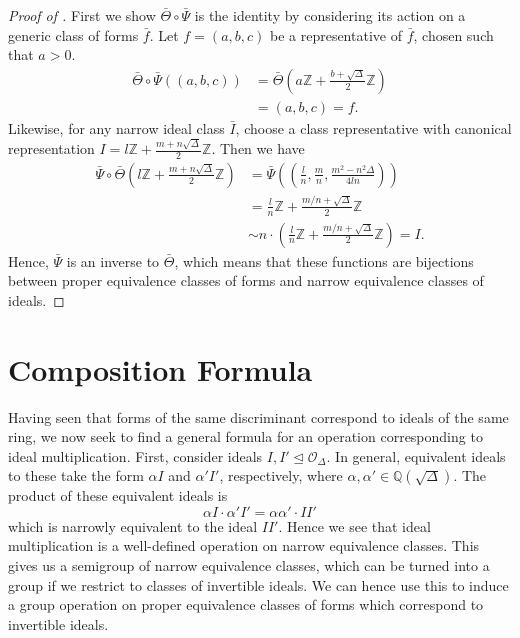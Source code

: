 \documentclass[honours,12pt]{unswthesis}
\newcommand{\Z}{\mathbb{Z}} %
\newcommand{\Q}{\mathbb{Q}} %
\newcommand{\order}{\mathcal{O}} %
\numberwithin{equation}{section}
\begin{document}
\begin{proof}[Proof of ]
First we show $\bar{\Theta} \circ \bar{\Psi}$ is the identity by considering its action on a generic class of forms $\bar{f}$.
Let $f = (a, b, c)$ be a representative of $\bar{f}$, chosen such that $a > 0$.
\begin{align*}
    \bar{\Theta} \circ \bar{\Psi} ((a, b, c)) &= \bar{\Theta} \left( a\Z + \frac{b + \sqrt\Delta}{2} \Z \right) \\
    &= (a, b, c) = f.
\end{align*}
Likewise, for any narrow ideal class $\bar{I}$, choose a class representative with canonical representation $I = l\Z + \frac{m + n\sqrt\Delta}{2}\Z$. 
Then we have
\begin{align*}
    \bar{\Psi} \circ \bar{\Theta} \left( l\Z + \frac{m + n\sqrt\Delta}{2}\Z \right) 
    &= \bar{\Psi} \left( \left( \frac{l}{n}, \frac{m}{n}, \frac{m^2 - n^2\Delta}{4ln} \right) \right) \\
    &= \frac{l}{n}\Z + \frac{m/n + \sqrt\Delta}{2} \Z \\
    &\sim n \cdot \left( \frac{l}{n}\Z + \frac{m/n + \sqrt\Delta}{2} \Z \right) = I.
\end{align*}
Hence, $\bar{\Psi}$ is an inverse to $\bar{\Theta}$, which means that these functions are bijections between proper equivalence classes of forms and narrow equivalence classes of ideals.
\end{proof}


\pagebreak
\section{Composition Formula}\label{s-comp-formula}

Having seen that forms of the same discriminant correspond to ideals of the same ring, 
we now seek to find a general formula for an operation corresponding to ideal multiplication.
First, consider ideals $I, I' \trianglelefteq \order_\Delta$.
In general, equivalent ideals to these take the form $\alpha I$ and $\alpha' I'$, respectively, where $\alpha, \alpha' \in \Q(\sqrt\Delta)$.
The product of these equivalent ideals is
$$\alpha I \cdot \alpha' I' = \alpha \alpha' \cdot I I'$$
which is narrowly equivalent to the ideal $II'$.
Hence we see that ideal multiplication is a well-defined operation on narrow equivalence classes.
This gives us a semigroup of narrow equivalence classes, which can be turned into a group if we restrict to classes of invertible ideals.
We can hence use this to induce a group operation on proper equivalence classes of forms which correspond to invertible ideals.
\end{document}
